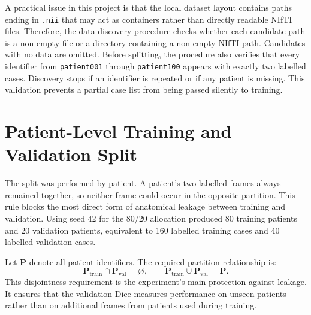 A practical issue in this project is that the local dataset layout contains paths ending in \texttt{.nii} that may act as containers rather than directly readable NIfTI files. Therefore, the data discovery procedure checks whether each candidate path is a non-empty file or a directory containing a non-empty NIfTI path. Candidates with no data are omitted. Before splitting, the procedure also verifies that every identifier from \texttt{patient001} through \texttt{patient100} appears with exactly two labelled cases. Discovery stops if an identifier is repeated or if any patient is missing. This validation prevents a partial case list from being passed silently to training.

\section{Patient-Level Training and Validation Split}
The split was performed by patient. A patient's two labelled frames always remained together, so neither frame could occur in the opposite partition. This rule blocks the most direct form of anatomical leakage between training and validation. Using seed 42 for the 80/20 allocation produced 80 training patients and 20 validation patients, equivalent to 160 labelled training cases and 40 labelled validation cases.

Let $\mathbf{P}$ denote all patient identifiers. The required partition relationship is:
\begin{equation}
    \mathbf{P}_{\mathrm{train}} \cap \mathbf{P}_{\mathrm{val}} = \varnothing,
    \qquad
    \mathbf{P}_{\mathrm{train}} \cup \mathbf{P}_{\mathrm{val}} = \mathbf{P}.
\end{equation}
This disjointness requirement is the experiment's main protection against leakage. It ensures that the validation Dice measures performance on unseen patients rather than on additional frames from patients used during training.

